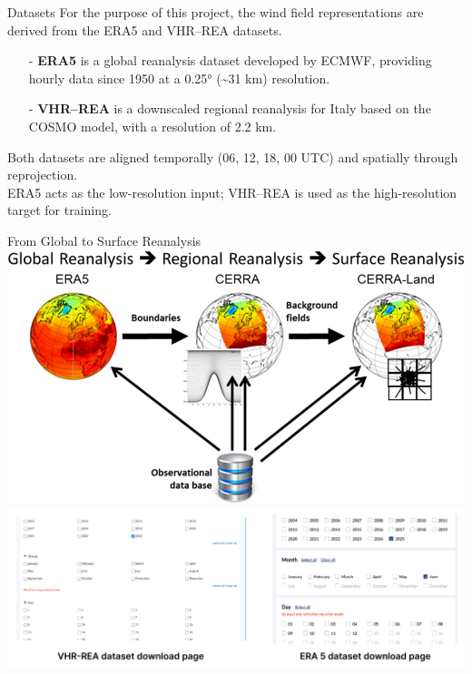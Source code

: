 \documentclass[footline=authortitle]{beamer}
\begin{document}

\begin{frame}{Datasets}
    For the purpose of this project, the wind field representations are derived from the ERA5 and VHR--REA datasets.
    \vspace{1em}
        \begin{itemize}
        \justifying
            \item[-] \textbf{ERA5} is a global reanalysis dataset developed by ECMWF, providing hourly data since 1950 at a 0.25° (\textasciitilde31 km) resolution.
            \item[-] \textbf{VHR--REA} is a downscaled regional reanalysis for Italy based on the COSMO model, with a resolution of 2.2 km.
        \end{itemize}
    \vspace{1em}
    Both datasets are aligned temporally (06, 12, 18, 00 UTC) and spatially through reprojection. \\
    \vspace{1em}
    ERA5 acts as the low-resolution input; VHR--REA is used as the high-resolution target for training.
\end{frame}

\begin{frame}{From Global to Surface Reanalysis}
    \centering
    \includegraphics[width=0.55\linewidth]{images/wind_speed.png}
    \centering
    \includegraphics[width=0.7\linewidth]{images/downloadtime.png}
\end{frame}
\end{document}

